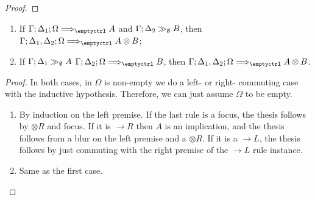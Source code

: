 \begin{proof}
\end{proof}

\begin{lemma}\label{otimeslemma}\mbox{}
  \begin{enumerate}
  \item If $\ztriseq{\Gamma}{\Delta_1}{\Omega}{\emptyctrl}{A}$ and
    $\Gamma; \Delta_2 \gg_{\emptyset} B$, then
    $\ztriseq{\Gamma}{\Delta_1, \Delta_2}{\Omega}{\emptyctrl}{A \otimes B}$;
  \item If $\Gamma; \Delta_1 \gg_{\emptyset} A$
    $\ztriseq{\Gamma}{\Delta_2}{\Omega}{\emptyctrl}{B}$, then
    $\ztriseq{\Gamma}{\Delta_1, \Delta_2}{\Omega}{\emptyctrl}{A \otimes B}$.
  \end{enumerate}
\end{lemma}
\begin{proof}
  In both cases, in $\Omega$ is non-empty we do a left- or right- commuting case
  with the inductive hypothesis. Therefore, we can just assume $\Omega$ to be
  empty.

  \begin{enumerate}
  \item

    By induction on the left premise. If the last rule is a focus, the thesis
    follows by $\otimes R$ and focus. If it is $\rightarrow R$ then $A$ is an
    implication, and the thesis follows from a blur on the left premise and a
    $\otimes R$. If it is a $\rightarrow L$, the thesis follows by just
    commuting with the right premise of the $\rightarrow L$ rule instance.

  \item Same as the first case.

  \end{enumerate}
\end{proof}

